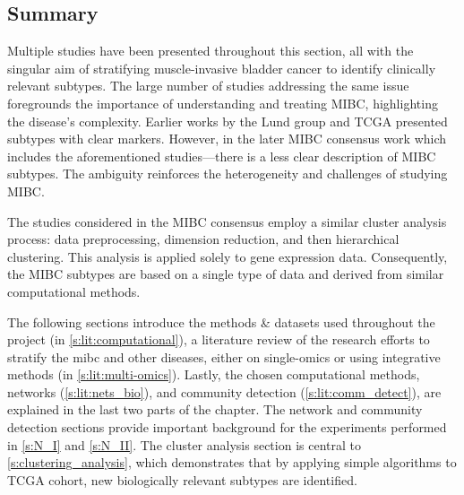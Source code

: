 
\subsection{Summary}

Multiple studies have been presented throughout this section, all with the singular aim of stratifying muscle-invasive bladder cancer to identify clinically relevant subtypes. The large number of studies addressing the same issue foregrounds the importance of understanding and treating MIBC, highlighting the disease's complexity. Earlier works by the Lund group \citep{Sjodahl2017-xr,Marzouka2018-ge} and TCGA \citep{Tcga2014-dr,Robertson2017-mg} presented subtypes with clear markers. However, in the later MIBC consensus work \citep{Kamoun2020-tj} which includes the aforementioned studies—there is a less clear description of MIBC subtypes. The ambiguity reinforces the heterogeneity and challenges of studying MIBC.

The studies considered in the MIBC consensus employ a similar cluster analysis process: data preprocessing, dimension reduction, and then hierarchical clustering. This analysis is applied solely to gene expression data. Consequently, the MIBC subtypes are based on a single type of data and derived from similar computational methods.

The following sections introduce the methods \& datasets used throughout the project (in \cref{s:lit:computational}), a literature review of the research efforts to stratify the \acrshort{mibc} and other diseases, either on single-omics or using integrative methods (in \cref{s:lit:multi-omics}). Lastly, the chosen computational methods, networks (\cref{s:lit:nets_bio}), and community detection (\cref{s:lit:comm_detect}), are explained in the last two parts of the chapter. The network and community detection sections provide important background for the experiments performed in \cref{s:N_I} and \cref{s:N_II}. The cluster analysis section is central to \cref{s:clustering_analysis}, which demonstrates that by applying simple algorithms to TCGA cohort, new biologically relevant subtypes are identified.




